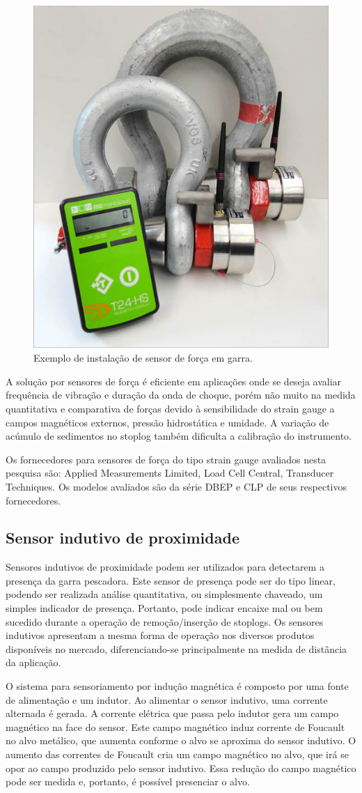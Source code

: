   \begin{figure}[H]
    \centering
    \includegraphics[width=0.4\columnwidth]{figs/forca/2.png}
    \caption{Exemplo de instalação de sensor de força em garra.}
    \label{forca_2}
\end{figure}

A solução por sensores de força é eficiente em aplicações onde se deseja avaliar frequência de vibração e duração da onda de choque, porém não muito na medida quantitativa e comparativa de forças devido à sensibilidade do strain gauge a campos magnéticos externos, pressão hidrostática e umidade. A variação de acúmulo de sedimentos no stoplog também dificulta a calibração do instrumento.

Os fornecedores para sensores de força do tipo strain gauge avaliados nesta pesquisa são: Applied Measurements Limited, Load Cell Central, Transducer Techniques. Os modelos avaliados são da série DBEP e CLP de seus respectivos fornecedores.



\subsection{Sensor indutivo de proximidade}

Sensores indutivos de proximidade podem ser utilizados para detectarem a presença da garra pescadora. Este sensor de presença pode ser do tipo linear, podendo ser realizada análise quantitativa, ou simplesmente chaveado, um simples indicador de presença. Portanto, pode indicar encaixe mal ou bem sucedido durante a operação de remoção/inserção de stoplogs. Os sensores indutivos apresentam a mesma forma de operação nos diversos produtos disponíveis no mercado, diferenciando-se principalmente na medida de distância da aplicação.

 O sistema para sensoriamento por indução magnética é composto por uma fonte de alimentação e um indutor. Ao alimentar o sensor indutivo, uma corrente alternada é gerada. A corrente elétrica que passa pelo indutor gera um campo magnético na face do sensor. Este campo magnético induz corrente de Foucault no alvo metálico, que aumenta conforme o alvo se aproxima do sensor indutivo. O aumento das correntes de Foucault cria um campo magnético no alvo, que irá se opor ao campo produzido pelo sensor indutivo. Essa redução do campo magnético pode ser medida e, portanto, é possível presenciar o alvo.

